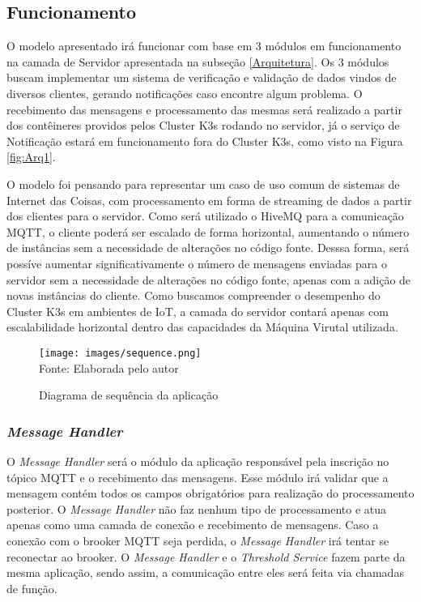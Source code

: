 \subsection{Funcionamento}

O modelo apresentado irá funcionar com base em 3 módulos em funcionamento na camada de Servidor apresentada na subseção \ref{Arquitetura}. 
Os 3 módulos buscam implementar um sistema de verificação e validação de dados vindos de diversos clientes, gerando notificações caso encontre algum problema. 
O recebimento das mensagens e processamento das mesmas será realizado a partir dos contêineres providos pelos Cluster K3s rodando no servidor, já o serviço de Notificação estará em funcionamento fora do Cluster K3s, como visto na Figura \ref{fig:Arq1}.

O modelo foi pensando para representar um caso de uso comum de sistemas de Internet das Coisas, com processamento em forma de streaming de dados a partir dos clientes para o servidor.
Como será utilizado o HiveMQ para a comunicação MQTT, o cliente poderá ser escalado de forma horizontal, aumentando o número de instâncias sem a necessidade de alterações no código fonte.
Desssa forma, será possíve aumentar significativamente o número de mensagens enviadas para o servidor sem a necessidade de alterações no código fonte, apenas com a adição de novas instâncias do cliente.
Como buscamos compreender o desempenho do Cluster K3s em ambientes de IoT, a camada do servidor contará apenas com escalabilidade horizontal dentro das capacidades da Máquina Virutal utilizada.

\begin{figure}[]
    \centering
    \caption{Diagrama de sequência da aplicação}
    \texttt{[image: images/sequence.png]}\\
 Fonte: Elaborada pelo autor
    \label{fig:enter-label}
\end{figure}

\subsubsection{\textit{Message Handler}}

O \textit{Message Handler} será o módulo da aplicação responsável pela inscrição no tópico MQTT e o recebimento das mensagens. 
Esse módulo irá validar que a mensagem contém todos os campos obrigatórios para realização do processamento posterior. 
O \textit{Message Handler} não faz nenhum tipo de processamento e atua apenas como uma camada de conexão e recebimento de mensagens.
Caso a conexão com o brooker MQTT seja perdida, o \textit{Message Handler} irá tentar se reconectar ao brooker.
O \textit{Message Handler} e o \textit{Threshold Service} fazem parte da mesma aplicação, sendo assim, a comunicação entre eles será feita via chamadas de função.

